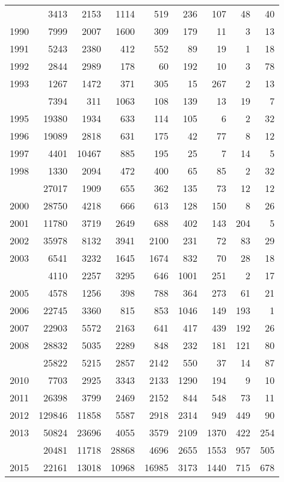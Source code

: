 \documentclass[
]{article}
\begin{document}
\begin{longtable}[t]{lrrrrrrrr}
\endfoot
\bottomrule
\endlastfoot
1989 & 3413 & 2153 & 1114 & 519 & 236 & 107 & 48 & 40\\
1990 & 7999 & 2007 & 1600 & 309 & 179 & 11 & 3 & 13\\
1991 & 5243 & 2380 & 412 & 552 & 89 & 19 & 1 & 18\\
1992 & 2844 & 2989 & 178 & 60 & 192 & 10 & 3 & 78\\
1993 & 1267 & 1472 & 371 & 305 & 15 & 267 & 2 & 13\\
\addlinespace
1994 & 7394 & 311 & 1063 & 108 & 139 & 13 & 19 & 7\\
1995 & 19380 & 1934 & 633 & 114 & 105 & 6 & 2 & 32\\
1996 & 19089 & 2818 & 631 & 175 & 42 & 77 & 8 & 12\\
1997 & 4401 & 10467 & 885 & 195 & 25 & 7 & 14 & 5\\
1998 & 1330 & 2094 & 472 & 400 & 65 & 85 & 2 & 32\\
\addlinespace
1999 & 27017 & 1909 & 655 & 362 & 135 & 73 & 12 & 12\\
2000 & 28750 & 4218 & 666 & 613 & 128 & 150 & 8 & 26\\
2001 & 11780 & 3719 & 2649 & 688 & 402 & 143 & 204 & 5\\
2002 & 35978 & 8132 & 3941 & 2100 & 231 & 72 & 83 & 29\\
2003 & 6541 & 3232 & 1645 & 1674 & 832 & 70 & 28 & 18\\
\addlinespace
2004 & 4110 & 2257 & 3295 & 646 & 1001 & 251 & 2 & 17\\
2005 & 4578 & 1256 & 398 & 788 & 364 & 273 & 61 & 21\\
2006 & 22745 & 3360 & 815 & 853 & 1046 & 149 & 193 & 1\\
2007 & 22903 & 5572 & 2163 & 641 & 417 & 439 & 192 & 26\\
2008 & 28832 & 5035 & 2289 & 848 & 232 & 181 & 121 & 80\\
\addlinespace
2009 & 25822 & 5215 & 2857 & 2142 & 550 & 37 & 14 & 87\\
2010 & 7703 & 2925 & 3343 & 2133 & 1290 & 194 & 9 & 10\\
2011 & 26398 & 3799 & 2469 & 2152 & 844 & 548 & 73 & 11\\
2012 & 129846 & 11858 & 5587 & 2918 & 2314 & 949 & 449 & 90\\
2013 & 50824 & 23696 & 4055 & 3579 & 2109 & 1370 & 422 & 254\\
\addlinespace
2014 & 20481 & 11718 & 28868 & 4696 & 2655 & 1553 & 957 & 505\\
2015 & 22161 & 13018 & 10968 & 16985 & 3173 & 1440 & 715 & 678\\

\end{longtable}
\end{document}
